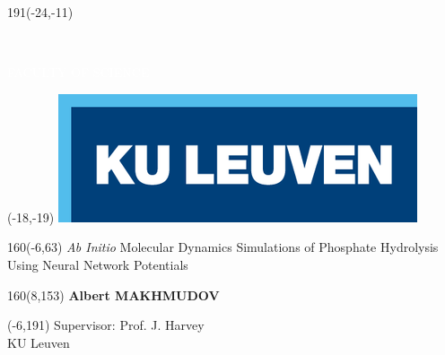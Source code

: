 \documentclass[12pt,a4paper,oneside]{book}
\begin{document}
\thispagestyle{empty}
\newcommand{\form}[1]{\scalebox{1.087}{\boldmath{#1}}}
\sffamily %
%
\begin{textblock}{191}(-24,-11)
\colorbox{bluetitle}{\hspace{139mm}\ \parbox[c][18truemm]{52mm}{\textcolor{white}{FACULTY OF SCIENCE}}}
\end{textblock}
%
\begin{textblock}{70}(-18,-19)
\textblockcolour{}
\includegraphics*[height=19.8truemm]{LogoKULeuven}
\end{textblock}
%
\begin{textblock}{160}(-6,63)
\textblockcolour{}
\vspace{-\parskip}
\flushleft
\fontsize{35}{37}\selectfont \textcolor{bluetitle}{\textit{Ab Initio} Molecular Dynamics Simulations of Phosphate Hydrolysis Using Neural Network Potentials}\\[1.5mm]
\end{textblock}
%
\begin{textblock}{160}(8,153)
\textblockcolour{}
\vspace{-\parskip}
\flushright
\fontsize{14}{16}\selectfont \textbf{Albert MAKHMUDOV}
\end{textblock}
%
\begin{textblock}{70}(-6,191)
\textblockcolour{}
\vspace{-\parskip}
\flushleft
Supervisor: Prof. J. Harvey\\[-2pt]
\textcolor{blueaff}{KU Leuven}\\[5pt]
\end{textblock}
\end{document}
